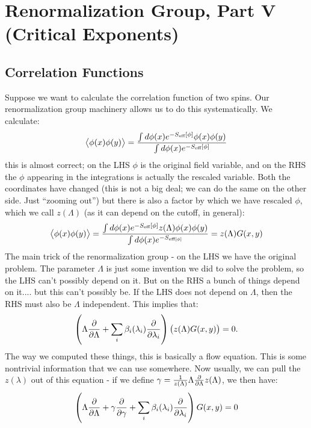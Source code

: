 \section{Renormalization Group, Part V (Critical Exponents)}
\subsection{Correlation Functions}
Suppose we want to calculate the correlation function of two spins. Our renormalization group machinery allows us to do this systematically. We calculate:
\begin{equation}
    \avg{\phi(x)\phi(y)} = \frac{\int d\phi(x) e^{-S_{\text{eff}}[\phi]}\phi(x)\phi(y)}{\int d\phi(x)e^{-S_{\text{eff}}[\phi]}}
\end{equation}
this is almost correct; on the LHS $\phi$ is the original field variable, and on the RHS the $\phi$ appearing in the integrations is actually the rescaled variable. Both the coordinates have changed (this is not a big deal; we can do the same on the other side. Just ``zooming out'') but there is also a factor by which we have rescaled $\phi$, which we call $z(\Lambda)$ (as it can depend on the cutoff, in general):
\begin{equation}
    \avg{\phi(x)\phi(y)} = \frac{\int d\phi(x) e^{-S_{\text{eff}}[\phi]}z(\Lambda)\phi(x)\phi(y)}{\int d\phi(x)e^{-S_{\text{eff}[\phi]}}} = z(\Lambda)G(x, y)
\end{equation}
The main trick of the renormalization group - on the LHS we have the original problem. The parameter $\Lambda$ is just some invention we did to solve the problem, so the LHS can't possibly depend on it. But on the RHS a bunch of things depend on it.... but this can't possibly be. If the LHS does not depend on $\Lambda$, then the RHS must also be $\Lambda$ independent. This implies that:
\begin{equation}
    \left(\Lambda \frac{\partial }{\partial \Lambda} + \sum_i \beta_i(\lambda_i)\frac{\partial }{\partial \lambda_i}\right)\left(z(\Lambda)G(x, y)\right) = 0.
\end{equation}
The way we computed these things, this is basically a flow equation. This is some nontrivial information that we can use somewhere. Now usually, we can pull the $z(\lambda)$ out of this equation - if we define $\gamma = \frac{1}{z(\Lambda)}\Lambda\frac{\partial }{\partial \Lambda}z(\Lambda)$, we then have:
\begin{equation}\label{eq-Gxyconstraint}
    \left(\Lambda \frac{\partial }{\partial \Lambda} + \gamma\frac{\partial }{\partial \gamma} + \sum_i \beta_i(\lambda_i)\frac{\partial }{\partial \lambda_i}\right)G(x, y) = 0
\end{equation}
